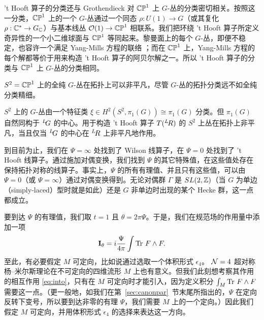 't Hooft 算子的分类还与 Grothendieck 对 ${\Bbb {CP}}^1$ 上 $G$-丛的分类密切相关。按照这一分类，${\Bbb {CP}}^1$ 上的一个 $G$-丛通过一个同态 $\rho:U(1)\to G$（或其复化 $\rho:\Bbb{C}^*\to G_{\Bbb{C}}$）与基本线丛 ${\cal O}(1)\to\Bbb{CP}^1$ 相联系。我们把环绕 't Hooft 算子所定义奇异性的一个小二维球面与 $\Bbb{CP}^1$ 等同起来。黎曼面上的每个 $G$-丛，即便不稳定，也容许一个满足 Yang-Mills 方程的联络 \cite{ref91}；而在 $\Bbb{CP}^1$ 上，Yang-Mills 方程的每个解都等价于用来构造 't Hooft 算子的阿贝尔解之一。所以 't Hooft 算子的分类与 $\Bbb{CP}^1$ 上 $G$-丛的分类相同。

\par{}

$S^2=\Bbb{CP}^1$ 上的全纯 $G$-丛在拓扑上可以非平凡，尽管 $G$-丛的拓扑分类远不如全纯分类精细。

$S^2$ 上的 $G$-丛由一个特征类 $\xi\in H^2(S^2,\pi_1(G))\cong \pi_1(G)$ 分类。但 $\pi_1(G)$ 自然同构于 $^L\negthinspace G$ 的中心。用于构造 't Hooft 算子 $T(^L\negthinspace R)$ 的 $S^2$ 上丛在拓扑上非平凡，当且仅当 $^L\negthinspace G$ 的中心在 $^L\negthinspace R$ 上非平凡地作用。

\par{}

到目前为止，我们在 $\Psi=\infty$ 处找到了 Wilson 线算子，在 $\Psi=0$ 处找到了 't Hooft 线算子。通过施加对偶变换，我们找到 $\Psi$ 的其它特殊值，在这些值处存在保持拓扑对称的线算子。事实上，$\Psi$ 的所有有理值、并且只有这些值，可以由 $\Psi=0$（或 $\Psi=\infty$）通过对偶变换得到。无论对偶群 $\Gamma$ 是 $SL(2,\Bbb{Z})$（当 $G$ 为单边（simply-laced）型时就是如此）还是 $G$ 非单边时出现的某个 Hecke 群，这一点都成立。

要到达 $\Psi$ 的有理值，我们取 $t=1$ 且 $\theta=2\pi \Psi$。于是，我们在规范场的作用量中添加一项 %
\setcounter{equation}{9}
\begin{equation}\label{eq:into}
{{\cmmib I}}_\theta=i{\Psi\over 4\pi}\int
\Tr\,F\wedge F.
\end{equation}
 至此，有必要假定 $M$ 可定向，比如说通过选取一个体积形式 $\epsilon_4$。 ${\EUN}=4$ 超对称杨–米尔斯理论在不可定向的四维流形 $M$ 上也有意义。但我们此刻想考察其作用的相互作用 \eqref{eq:into}，只有在 $M$ 可定向时才能引入，因为定义积分 $\int_M\Tr\,F\wedge F$ 需要这一点。（更一般地，如我们在第~\ref{sec:canonpar}~节末尾所指出的，$\Psi$ 在定向反转下变号，所以要到达非零的有理 $\Psi$，我们需要 $M$ 上的一个定向。）因此我们假定 $M$ 可定向，并用体积形式 $\epsilon_4$ 的选择来表达这一方向。

